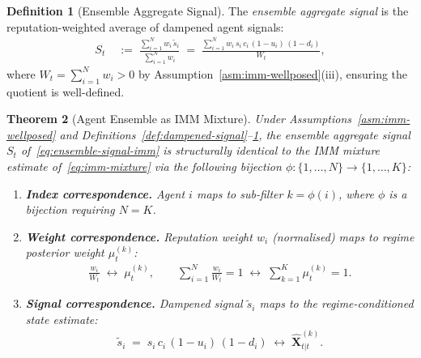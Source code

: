 \documentclass[12pt,openany]{book}
\numberwithin{equation}{chapter}
\theoremstyle{plain}
\newtheorem{theorem}{Theorem}[chapter]
\theoremstyle{definition}
\newtheorem{definition}[theorem]{Definition}
\theoremstyle{remark}
\begin{document}
\begin{definition}[Ensemble Aggregate Signal]
\label{def:ensemble-signal}
The \emph{ensemble aggregate signal} is the reputation-weighted
average of dampened agent signals:
\begin{align}
  S_t
  &\;:=\;
  \frac{\displaystyle\sum_{i=1}^{N}
        w_i\,\tilde{s}_i}
       {\displaystyle\sum_{i=1}^{N} w_i}
  \;=\;
  \frac{\displaystyle\sum_{i=1}^{N}
        w_i\,s_i\,c_i\,(1-u_i)\,(1-d_i)}
       {W_t},
  \label{eq:ensemble-signal-imm}
\end{align}
where $W_t = \sum_{i=1}^{N} w_i > 0$ by
Assumption~\ref{asm:imm-wellposed}(iii), ensuring the
quotient is well-defined.
\end{definition}

\begin{theorem}[Agent Ensemble as IMM Mixture]
\label{thm:ensemble-imm}
Under Assumptions~\ref{asm:imm-wellposed}
and Definitions~\ref{def:dampened-signal}--\ref{def:ensemble-signal},
the ensemble aggregate signal $S_t$
of~\eqref{eq:ensemble-signal-imm} is \emph{structurally identical}
to the IMM mixture estimate of~\eqref{eq:imm-mixture} via the
following bijection $\phi: \{1,\ldots,N\} \to \{1,\ldots,K\}$:
\begin{enumerate}
  \item \textbf{Index correspondence.}
        Agent $i$ maps to sub-filter $k = \phi(i)$, where
        $\phi$ is a bijection requiring $N = K$.
  \item \textbf{Weight correspondence.}
        Reputation weight $w_i$ (normalised) maps to regime
        posterior weight $\mu_t^{(k)}$:
        \begin{align}
          \frac{w_i}{W_t}
          \;\longleftrightarrow\;
          \mu_t^{(k)}, \qquad
          \sum_{i=1}^{N}\frac{w_i}{W_t} = 1
          \;\longleftrightarrow\;
          \sum_{k=1}^{K}\mu_t^{(k)} = 1.
          \label{eq:weight-bijection}
        \end{align}
  \item \textbf{Signal correspondence.}
        Dampened signal $\tilde{s}_i$ maps to the
        regime-conditioned state estimate:
        \begin{align}
          \tilde{s}_i
          \;=\; s_i\,c_i\,(1-u_i)\,(1-d_i)
          \;\longleftrightarrow\;
          \hat{\mathbf{X}}_{t|t}^{(k)}.
          \label{eq:signal-bijection}
        \end{align}
\end{enumerate}
\end{theorem}
\end{document}
